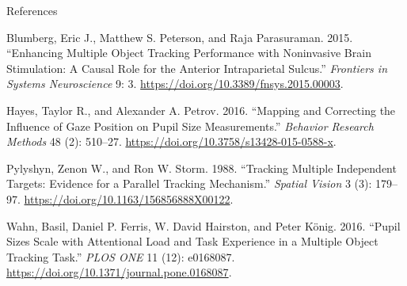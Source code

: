 \documentclass[12pt,ignorenonframetext,aspectratio=169]{beamer}
\begin{document}
\begin{frame}{References}
\protect\hypertarget{references}{}

\hypertarget{refs}{}
\leavevmode\hypertarget{ref-Blumberg2015}{}%
Blumberg, Eric J., Matthew S. Peterson, and Raja Parasuraman. 2015. ``Enhancing Multiple Object Tracking Performance with Noninvasive Brain Stimulation: A Causal Role for the Anterior Intraparietal Sulcus.'' \emph{Frontiers in Systems Neuroscience} 9: 3. \url{https://doi.org/10.3389/fnsys.2015.00003}.

\leavevmode\hypertarget{ref-hayesMappingCorrectingInfluence2016}{}%
Hayes, Taylor R., and Alexander A. Petrov. 2016. ``Mapping and Correcting the Influence of Gaze Position on Pupil Size Measurements.'' \emph{Behavior Research Methods} 48 (2): 510--27. \url{https://doi.org/10.3758/s13428-015-0588-x}.

\leavevmode\hypertarget{ref-pylyshynTrackingMultipleIndependent1988}{}%
Pylyshyn, Zenon W., and Ron W. Storm. 1988. ``Tracking Multiple Independent Targets: Evidence for a Parallel Tracking Mechanism.'' \emph{Spatial Vision} 3 (3): 179--97. \url{https://doi.org/10.1163/156856888X00122}.

\leavevmode\hypertarget{ref-wahnPupilSizesScale2016}{}%
Wahn, Basil, Daniel P. Ferris, W. David Hairston, and Peter König. 2016. ``Pupil Sizes Scale with Attentional Load and Task Experience in a Multiple Object Tracking Task.'' \emph{PLOS ONE} 11 (12): e0168087. \url{https://doi.org/10.1371/journal.pone.0168087}.

\end{frame}
\end{document}
